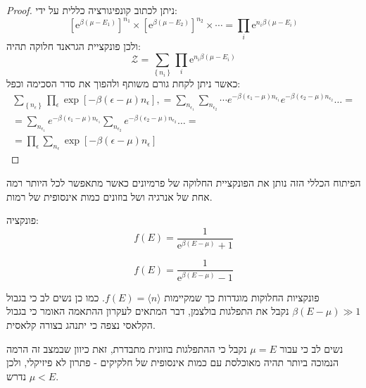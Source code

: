 \documentclass{tstextbook}
\begin{document}
\begin{proof}
ניתן לכתוב קונפיגורציה כללית על ידי:
$$\left[\mathrm{e}^{\beta(\mu-E_{1})}\right]^{n_{1}}\times\left[\mathrm{e}^{\beta(\mu-E_{2})}\right]^{n_{2}}\times\cdots=\prod_{i}\mathrm{e}^{n_{i}\beta(\mu-E_{i})}$$
ולכן פונקציית הגראנד חלוקה תהיה:
$${\mathcal{Z}}=\sum_{\left\{n_{i}\right\}}\prod_{i}\mathrm{e}^{n_{i}\beta(\mu-E_{i})}$$
כאשר ניתן לקחת גורם משותף ולהפוך את סדר הסכימה וכפל:
$$\begin{gather}\sum_{\left\{ n_{\epsilon} \right\}}\prod_{\epsilon}\exp\left[ -\beta\left( \epsilon-\mu \right)n_{\epsilon} \right],=\sum_{n_{\epsilon_{1}}}\sum_{n_{\epsilon_{2}}}\cdots e^{-\beta\left( \epsilon_{1}-\mu \right)n_{\epsilon_{1}}}e^{-\beta\left( \epsilon_{2}-\mu \right)n_{\epsilon_{2}}}\ldots=\\=\sum_{n_{\epsilon_{1}}}e^{-\beta\left( \epsilon_{1}-\mu \right)n_{\epsilon_{1}}}\sum_{n_{\epsilon_{2}}}e^{-\beta\left( \epsilon_{2}-\mu \right)n_{\epsilon_{2}}}\ldots =\\=\prod_{\epsilon}\sum_{n_{\epsilon}}\exp\left[ -\beta\left( \epsilon-\mu \right)n_{\epsilon} \right] 
\end{gather}$$

\end{proof}
\begin{remark}
הפיתוח הכללי הזה נותן את הפונקציית החלוקה של פרמיונים כאשר מתאפשר לכל היותר רמה אחת של אנרגיה ושל בוזונים כמות אינסופית של רמות.

\end{remark}
\begin{definition}
פונקציה:
$$f(E)=\frac{1}{\mathrm{e}^{\beta(E-\mu)}+1}$$

\end{definition}
\begin{definition}
$$f(E)=\frac{1}{\mathrm{e}^{\beta(E-\mu)}-1}$$

\end{definition}
\begin{remark}
פונקציות החלוקות מוגדרות כך שמקיימות \(f(E)=\langle n \rangle\). כמו כן נשים לב כי בגבול \(\beta\left( E-\mu \right)\gg 1\) נקבל את התפלגות בולצמן, דבר המתאים לעקרון ההתאמה האומר כי בגבול הקלאסי נצפה כי יתנהג בצורה קלאסית.

\end{remark}
\begin{remark}
נשים לב כי עבור \(\mu=E\) נקבל כי ההתפלגות בוזונית מתבדרת, זאת כיוון שבמצב זה הרמה הנמוכה ביותר תהיה מאוכלסת עם כמות אינסופית של חלקיקים - פתרון לא פיזיקלי, ולכן נדרש \(\mu< E\).

\end{remark}
\end{document}
